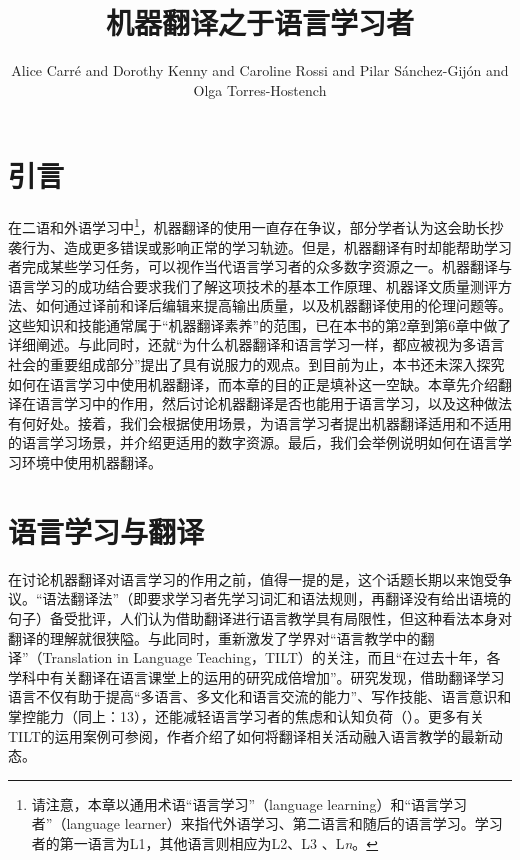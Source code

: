 \documentclass[output=paper,colorlinks,citecolor=brown]{langscibook}
\author{Alice Carré\affiliation{格勒诺布尔-阿尔卑斯大学} and Dorothy Kenny\affiliation{都柏林城市大学} and Caroline Rossi\affiliation{格勒诺布尔-阿尔卑斯大学} and  Pilar Sánchez-Gijón\affiliation{巴塞罗那自治大学} and Olga Torres-Hostench\affiliation{巴塞罗那自治大学}}
\title{机器翻译之于语言学习者}
\begin{document}
\AffiliationsWithIndexing{}
\maketitle

\section{引言}\label{sec:carre:1}

在二语和外语学习中\footnote{请注意，本章以通用术语“语言学习”（language learning）和“语言学习者”（language learner）来指代外语学习、第二语言和随后的语言学习。学习者的第一语言为L1，其他语言则相应为L2、L3
、L\textit{n}。}，机器翻译的使用一直存在争议，部分学者认为这会助长抄袭行为、造成更多错误或影响正常的学习轨迹。但是，机器翻译有时却能帮助学习者完成某些学习任务，可以视作当代语言学习者的众多数字资源之一。机器翻译与语言学习的成功结合要求我们了解这项技术的基本工作原理、机器译文质量测评方法、如何通过译前和译后编辑来提高输出质量，以及机器翻译使用的伦理问题等。这些知识和技能通常属于“机器翻译素养”\citep{BowkerCiro2019}的范围，已在本书的第2章到第6章中做了详细阐述。与此同时，还就“为什么机器翻译和语言学习一样，都应被视为多语言社会的重要组成部分”提出了具有说服力的观点。到目前为止，本书还未深入探究如何在语言学习中使用机器翻译，而本章的目的正是填补这一空缺。本章先介绍翻译在语言学习中的作用，然后讨论机器翻译是否也能用于语言学习，以及这种做法有何好处。接着，我们会根据使用场景，为语言学习者提出机器翻译适用和不适用的语言学习场景，并介绍更适用的数字资源。最后，我们会举例说明如何在语言学习环境中使用机器翻译。


\section{语言学习与翻译}\label{sec:carre:2}
在讨论机器翻译对语言学习的作用之前，值得一提的是，这个话题长期以来饱受争议。“语法翻译法”（即要求学习者先学习词汇和语法规则，再翻译没有给出语境的句子）备受批评，人们认为借助翻译进行语言教学具有局限性，但这种看法本身对翻译的理解就很狭隘。与此同时，\citet{Cook2010}重新激发了学界对“语言教学中的翻译”（Translation in Language Teaching，TILT）的关注，而且“在过去十年，各学科中有关翻译在语言课堂上的运用的研究成倍增加”\citep[12]{PintadoGutiérrez2018}。研究发现，借助翻译学习语言不仅有助于提高“多语言、多文化和语言交流的能力”、写作技能、语言意识和掌控能力（同上：13），还能减轻语言学习者的焦虑和认知负荷（\citealt{KellyBruen2017}）。更多有关TILT的运用案例可参阅\citet{CarreresGutiérrez2021}，作者介绍了如何将翻译相关活动融入语言教学的最新动态。
\end{document}
